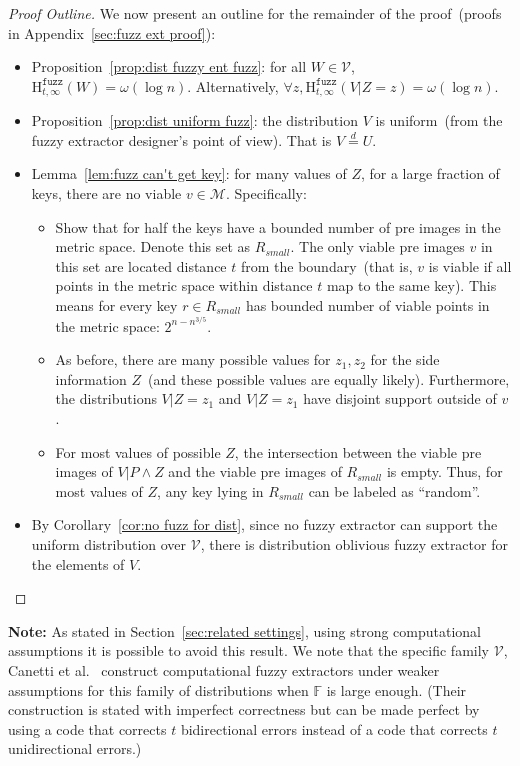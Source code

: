 \documentclass[11pt]{article}
\newcommand{\secref}[1]{\mbox{Section~\ref{#1}}}
\newcommand{\apref}[1]{\mbox{Appendix~\ref{#1}}}
\newcommand{\corref}[1]{\mbox{Corollary~\ref{#1}}}
\newcommand{\lemref}[1]{\mbox{Lemma~\ref{#1}}}
\newcommand{\propref}[1]{\mbox{Proposition~\ref{#1}}}
\newcommand{\Hfuzz}{\mathrm{H}^{\mathtt{fuzz}}_{t,\infty}}
\begin{document}
\begin{proof}[Proof Outline]
We now present an outline for the remainder of the proof~(proofs in \apref{sec:fuzz ext proof}):
\begin{itemize}
\item \propref{prop:dist fuzzy ent fuzz}: for all $W\in \mathcal{V}$, $\Hfuzz(W) = \omega (\log n)$. Alternatively, $\forall z, \Hfuzz(V | Z=z) = \omega(\log n)$.
\item \propref{prop:dist uniform fuzz}: the distribution $V$ is uniform~(from the fuzzy extractor designer's point of view).  That is $V\overset{d}=U$.
\item \lemref{lem:fuzz can't get key}: for many values of $Z$, for a large fraction of keys, there are no viable $v\in\mathcal{M}$.  Specifically:
\begin{itemize}
\item Show that for half the keys have a bounded number of pre images in the metric space.  Denote this set as $R_{small}$.  The only viable pre images $v$ in this set are located distance $t$ from the boundary~(that is, $v$ is viable if all points in the metric space within distance $t$ map to the same key).  This means for every key $r\in R_{small}$ has bounded number of viable points in the metric space: $2^{n-n^{3/5}}$.
\item As before, there are many possible values for $z_1, z_2$ for the side information $Z$~(and these possible values are equally likely).  Furthermore, the distributions $V|Z=z_1 $ and $V| Z=z_1$ have disjoint support outside of $v$.
\item For most values of possible $Z$, the intersection between the viable pre images of $V|P \wedge Z$ and the viable pre images of $R_{small}$ is empty.  Thus, for most values of $Z$, any key lying in $R_{small}$ can be labeled as ``random''.
\end{itemize}
\item By \corref{cor:no fuzz for dist}, since no fuzzy extractor can support the uniform distribution over $\mathcal{V}$, there is distribution oblivious fuzzy extractor for the elements of $V$.
\end{itemize}

\end{proof}

\noindent
\textbf{Note:} As stated in \secref{sec:related settings}, using strong computational assumptions it is possible to avoid this result.  We note that the specific family $\mathcal{V}$, Canetti et al.~\cite[Construction 5.3]{canetti2014key} construct computational fuzzy extractors under weaker assumptions for this family of distributions when $\mathbb{F}$ is large enough.  (Their construction is stated with imperfect correctness but can be made perfect by using a code that corrects $t$ bidirectional errors instead of a code that corrects $t$ unidirectional errors.)
\end{document}
